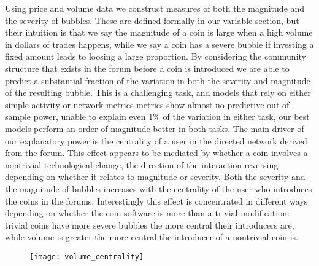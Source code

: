 Using price and volume data we construct measures of both the magnitude and the severity of bubbles.
These are defined formally in our variable section,
but their intuition is that we say the magnitude of a coin is large when a high volume in dollars of trades happens,
while we say a coin has a severe bubble if investing a fixed amount leads to loosing a large proportion. 
By considering the community structure that exists in the forum before a coin is introduced we are able to predict a substantial fraction of the variation in both the severity and magnitude of the resulting bubble.
This is a challenging task, and models that rely on either simple activity or network metrics metrics show almost no predictive out-of-sample power, unable to explain even 1\% of the variation in either task,
our best models perform an order of magnitude better in both tasks.
The main driver of our explanatory power is the centrality of a user in the directed network derived from the forum. 
This effect appears to be mediated by whether a coin involves a nontrivial technological change, the direction of the interaction reversing depending on whether it relates to magnitude or severity.
Both the severity and the magnitude of bubbles increases with the centrality of the user who introduces the coins in the forums.  
Interestingly this effect is concentrated in different ways depending on whether the coin software is more than a trivial modification: trivial coins have more severe bubbles the more central their introducers are, while volume is greater the more central the introducer of a nontrivial coin is.





\begin{figure}
\texttt{[image: volume\_centrality]}
\end{figure}

